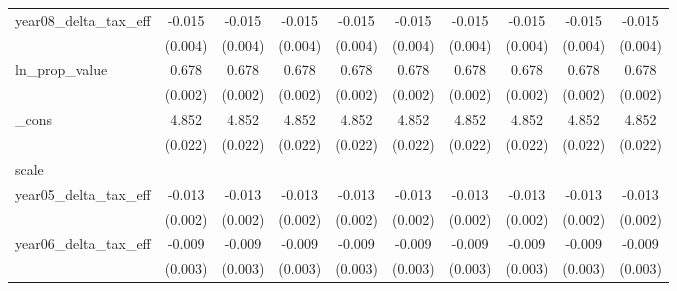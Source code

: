 {\begin{tabular}{l*{9}{c}}
year08\_delta\_tax\_eff&      -0.015\sym{***}&      -0.015\sym{***}&      -0.015\sym{***}&      -0.015\sym{***}&      -0.015\sym{***}&      -0.015\sym{***}&      -0.015\sym{***}&      -0.015\sym{***}&      -0.015\sym{***}\\
            &     (0.004)         &     (0.004)         &     (0.004)         &     (0.004)         &     (0.004)         &     (0.004)         &     (0.004)         &     (0.004)         &     (0.004)         \\
[1em]
ln\_prop\_value&       0.678\sym{***}&       0.678\sym{***}&       0.678\sym{***}&       0.678\sym{***}&       0.678\sym{***}&       0.678\sym{***}&       0.678\sym{***}&       0.678\sym{***}&       0.678\sym{***}\\
            &     (0.002)         &     (0.002)         &     (0.002)         &     (0.002)         &     (0.002)         &     (0.002)         &     (0.002)         &     (0.002)         &     (0.002)         \\
[1em]
\_cons      &       4.852\sym{***}&       4.852\sym{***}&       4.852\sym{***}&       4.852\sym{***}&       4.852\sym{***}&       4.852\sym{***}&       4.852\sym{***}&       4.852\sym{***}&       4.852\sym{***}\\
            &     (0.022)         &     (0.022)         &     (0.022)         &     (0.022)         &     (0.022)         &     (0.022)         &     (0.022)         &     (0.022)         &     (0.022)         \\
\hline
scale       &                     &                     &                     &                     &                     &                     &                     &                     &                     \\
year05\_delta\_tax\_eff&      -0.013\sym{***}&      -0.013\sym{***}&      -0.013\sym{***}&      -0.013\sym{***}&      -0.013\sym{***}&      -0.013\sym{***}&      -0.013\sym{***}&      -0.013\sym{***}&      -0.013\sym{***}\\
            &     (0.002)         &     (0.002)         &     (0.002)         &     (0.002)         &     (0.002)         &     (0.002)         &     (0.002)         &     (0.002)         &     (0.002)         \\
[1em]
year06\_delta\_tax\_eff&      -0.009\sym{***}&      -0.009\sym{***}&      -0.009\sym{***}&      -0.009\sym{***}&      -0.009\sym{***}&      -0.009\sym{***}&      -0.009\sym{***}&      -0.009\sym{***}&      -0.009\sym{***}\\
            &     (0.003)         &     (0.003)         &     (0.003)         &     (0.003)         &     (0.003)         &     (0.003)         &     (0.003)         &     (0.003)         &     (0.003)         \\

\end{tabular}}
